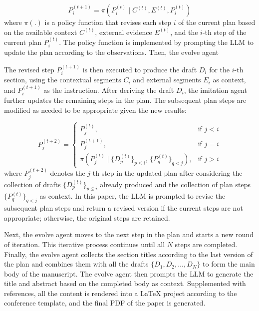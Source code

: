 \documentclass[manuscript,review,anonymous]{acmart}
\begin{document}
\begin{equation}
P_i^{(t+1)} = \pi(P_i^{(t)} \mid C^{(t)}, E^{(t)}, P_i^{(t)})
\end{equation}
where $\pi(.)$ is a policy function that revises each step $i$ of the current plan based on the available context $C^{(t)}$, external evidence $E^{(t)}$, and the $i$-th step of the current plan $P_i^{(t)}$. The policy function is implemented by prompting the LLM to update the plan according to the observations. Then, the evolve agent 

The revised step $P_i^{(t+1)}$ is then executed to produce the draft $D_i$ for the $i$-th section, using the contextual segments $C_i$ and external segments $E_i$ as context, and $P_i^{(t+1)}$ as the instruction. After deriving the draft $D_i$, the imitation agent further updates the remaining steps in the plan. The subsequent plan steps are modified as needed to be appropriate given the new results:

\begin{equation}
P_j^{(t+2)} = 
\begin{cases}
P_j^{(t)}, & \text{if } j < i \\
P_j^{(t+1)}, & \text{if } j = i \\
\pi\left(P_j^{(t)} \mid \{D_p^{(t)}\}_{p \leq i},\, \{P_q^{(t)}\}_{q < j}\right), & \text{if } j > i
\end{cases}
\end{equation}
where $P_j^{(t+2)}$ denotes the $j$-th step in the updated plan after considering the collection of drafts $\{D^{(t)}_p\}_{p \leq i}$ already produced and the collection of plan steps $\{P_q^{(t)}\}_{q < j}$ as context. In this paper, the LLM is prompted to revise the subsequent plan steps and return a revised version if the current steps are not appropriate; otherwise, the original steps are retained.

Next, the evolve agent moves to the next step in the plan and starts a new round of iteration. This iterative process continues until all $N$ steps are completed. Finally, the evolve agent collects the section titles according to the last version of the plan and combines them with all the drafts $\{D_1, D_2, \ldots, D_N\}$ to form the main body of the manuscript. The evolve agent then prompts the LLM to generate the title and abstract based on the completed body as context. Supplemented with references, all the content is rendered into a LaTeX project according to the conference template, and the final PDF of the paper is generated.
\end{document}
